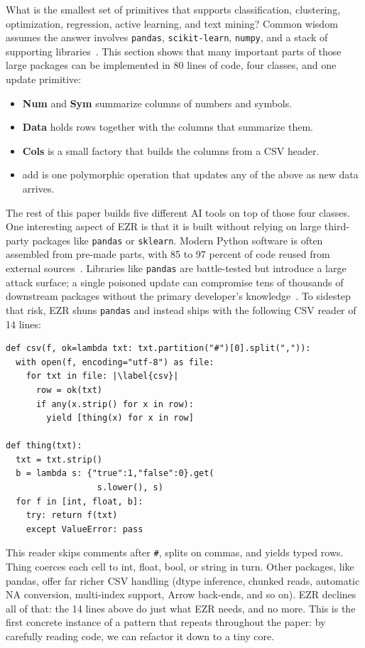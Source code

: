 \documentclass[AMA,STIX2COL]{WileyNJDv5}
\newcommand{\IT}{{\sffamily EZR}}
\newcommand{\cls}[1]{%
  \setlength{\fboxsep}{1.5pt}%
  \colorbox{clsbg}{\sffamily\bfseries{#1}}%
}
\begin{document}
What is the smallest set of primitives that supports
classification, clustering, optimization, regression, active
learning, and text mining? Common wisdom assumes the answer
involves \texttt{pandas}, \texttt{scikit-learn}, \texttt{numpy},
and a stack of supporting libraries~\cite{martinez2021}. This
section shows that many important parts
of those large packages can be implemented in 
80 lines of code, four classes, and one update
primitive:
\begin{itemize}
\item \cls{Num} and \cls{Sym} summarize columns of numbers and
symbols.
\item \cls{Data} holds rows together with the columns that
summarize them.
\item \cls{Cols} is a small factory that builds the columns
from a CSV header.
\item \textsf{add} is one polymorphic operation that updates any
of the above as new data arrives.
\end{itemize}
The rest of this paper builds five different AI tools on top of
those four classes. One interesting
aspect of EZR is that it is built without relying on
large third-party packages like
 \texttt{pandas} or  \texttt{sklearn}.   Modern Python software
is often assembled from pre-made parts, with 85 to 97 percent
of code reused from external sources~\cite{martinez2021}.
Libraries like \texttt{pandas} are battle-tested but introduce
a large attack surface; a single poisoned update can compromise
tens of thousands of downstream packages without the primary
developer's knowledge~\cite{martinez2021}. To sidestep that
risk, \IT{} shuns \texttt{pandas} and instead ships with the
following CSV reader of 14 lines:
\begin{lstlisting}
def csv(f, ok=lambda txt: txt.partition("#")[0].split(",")):
  with open(f, encoding="utf-8") as file:
    for txt in file: |\label{csv}|
      row = ok(txt)
      if any(x.strip() for x in row):
        yield [thing(x) for x in row]

def thing(txt):
  txt = txt.strip()
  b = lambda s: {"true":1,"false":0}.get(
                  s.lower(), s)
  for f in [int, float, b]:
    try: return f(txt)
    except ValueError: pass
\end{lstlisting}
This reader skips comments after \texttt{\#}, splits on commas,
and yields typed rows. \textsf{Thing} coerces each cell to int,
float, bool, or string in turn. 
Other packages, like \textsf{pandas}, offer far richer CSV
handling (dtype inference, chunked reads, automatic NA
conversion, multi-index support, Arrow back-ends, and so on).
\IT{} declines all of that: the 14 lines above do just what
\IT{} needs, and no more. This is the first
concrete instance of a pattern that repeats throughout the paper:
by carefully reading code, we can refactor it down to a tiny core.
\end{document}
